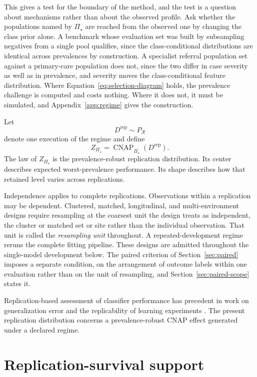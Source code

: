 \documentclass[11pt]{article}
\newcommand{\CNAP}{\operatorname{CNAP}}
\newcommand{\Regime}{\mathcal{R}}
\newcommand{\PSet}{\Pi_\star}
\newcommand{\RobCNAP}{\underline{\CNAP}_{\PSet}}
\theoremstyle{remark}
\begin{document}
This gives a test for the boundary of the method, and the test is a question about mechanisms rather than about the observed profile. Ask whether the populations named by $\PSet$ are reached from the observed one by changing the class prior alone. A benchmark whose evaluation set was built by subsampling negatives from a single pool qualifies, since the class-conditional distributions are identical across prevalences by construction. A specialist referral population set against a primary-care population does not, since the two differ in case severity as well as in prevalence, and severity moves the class-conditional feature distribution. Where Equation~\eqref{eq:selection-diagram} holds, the prevalence challenge is computed and costs nothing. Where it does not, it must be simulated, and Appendix~\ref{app:regime} gives the construction.

Let
\[
D^{\mathrm{rep}}\sim P_{\Regime}
\]
denote one execution of the regime and define
\begin{equation}
Z_{\PSet}
=
\RobCNAP(D^{\mathrm{rep}}).
\label{eq:robust-replication-effect}
\end{equation}
The law of $Z_{\PSet}$ is the prevalence-robust replication distribution. Its center describes expected worst-prevalence performance. Its shape describes how that retained level varies across replications.

Independence applies to complete replications. Observations within a replication may be dependent. Clustered, matched, longitudinal, and multi-environment designs require resampling at the coarsest unit the design treats as independent, the cluster or matched set or site rather than the individual observation. That unit is called the \emph{resampling unit} throughout. A repeated-development regime reruns the complete fitting pipeline. These designs are admitted throughout the single-model development below. The paired criterion of Section~\ref{sec:paired} imposes a separate condition, on the arrangement of outcome labels within one evaluation rather than on the unit of resampling, and Section~\ref{sec:paired-scope} states it.

Replication-based assessment of classifier performance has precedent in work on generalization error and the replicability of learning experiments \cite{nadeau2003inference,bouckaert2004estimating}. The present replication distribution concerns a prevalence-robust CNAP effect generated under a declared regime.

\section{Replication-survival support}
\label{sec:support}
\end{document}
